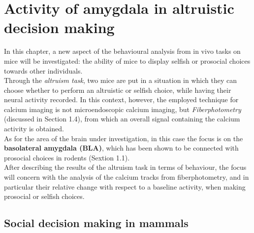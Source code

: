 \documentclass[a4paper]{article}
\begin{document}
	
	
\section{Activity of amygdala in altruistic decision making}

In this chapter, a new aspect of the behavioural analysis from in vivo tasks on mice will be investigated: the ability of mice to display selfish or prosocial choices towards other individuals.\\
Through the \textit{altruism task}, two mice are put in a situation in which they can choose whether to perform an altruistic or selfish choice, while having their neural activity recorded. In this context, however, the employed technique for calcium imaging is not microendoscopic calcium imaging, but \textit{Fiberphotometry} (discussed in Section 1.4), from which an overall signal containing the calcium activity is obtained.\\
As for the area of the brain under investigation, in this case the focus is on the \textbf{basolateral amygdala (BLA)}, which has been shown to be connected with prosocial choices in rodents (Sextion 1.1).\\
After describing the results of the altruism task in terms of behaviour, the focus will concern with the analysis of the calcium tracks from fiberphotometry, and in particular their relative change with respect to a baseline activity, when making prosocial or selfish choices.


\subsection{Social decision making in mammals}
\end{document}
